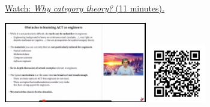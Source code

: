 
\begin{minipage}{10cm}
    \href{https://act4e-spring21.netlify.app/videos/spring2021-intro:why-cat-theory.html}{Watch: \emph{Why category theory?} (11 minutes).}
        
    \href{https://act4e-spring21.netlify.app/videos/spring2021-intro:why-cat-theory.html}{\includegraphics[height=3.5cm]{spring2021-intro:why-cat-theory/thumbnails.jpg}}
    \href{https://act4e-spring21.netlify.app/videos/spring2021-intro:why-cat-theory.html}{\includegraphics[height=2.5cm]{spring2021-intro:why-cat-theory/qrcode.png}}
\end{minipage}
